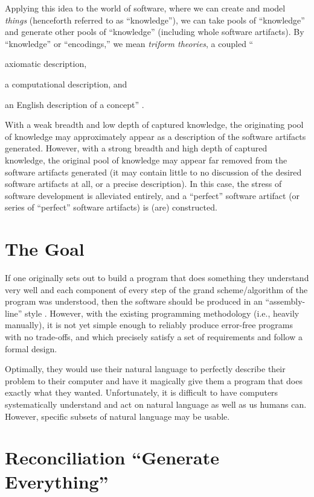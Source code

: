 Applying this idea to the world of software, where we can create and model
\textit{things} (henceforth referred to as ``knowledge''), we can take pools of
``knowledge'' and generate other pools of ``knowledge'' (including whole
software artifacts). By ``knowledge'' or ``encodings,'' we mean \textit{triform
theories}, a coupled ``\begin{inparaenum}[(1)]
    \item axiomatic description,
    \item a computational description, and 
    \item an English description of a concept'' \cite{well-understood}.
\end{inparaenum}
With a weak breadth and low depth of captured
knowledge, the originating pool of knowledge may approximately appear as a
description of the software artifacts generated. However, with a strong breadth
and high depth of captured knowledge, the original pool of knowledge may appear
far removed from the software artifacts generated (it may contain little to no
discussion of the desired software artifacts at all, or a precise description).
In this case, the stress of software development is alleviated entirely, and a
``perfect'' software artifact (or series of ``perfect'' software artifacts) is
(are) constructed.

\section{The Goal}
\label{sec:idlgy:the_goal}

If one originally sets out to build a program that does something they
understand very well and each component of every step of the grand
scheme/algorithm of the program was understood, then the software should be
produced in an ``assembly-line'' style \cite{well-understood}. However, with the
existing programming methodology (i.e., heavily manually), it is not yet simple
enough to reliably produce error-free programs with no trade-offs, and which
precisely satisfy a set of requirements and follow a formal design.

Optimally, they would use their natural language to perfectly describe their
problem to their computer and have it magically give them a program that does
exactly what they wanted. Unfortunately, it is difficult to have computers
systematically understand and act on natural language as well as us humans can.
However, specific subsets of natural language may be usable.

\section{Reconciliation \textemdash{} \textquotedblleft{}Generate Everything\textquotedblright{}}
\label{sec:idlgy:generate_everything}


